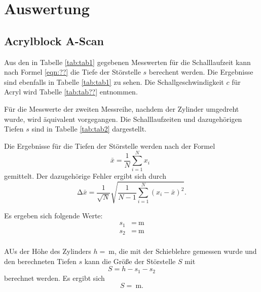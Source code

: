 \section{Auswertung}
\label{sec:Auswertung}

\subsection{Acrylblock A-Scan}

Aus den in Tabelle \ref{tab:tab1} gegebenen Messwerten für die Schalllaufzeit
kann nach Formel \ref{eqn:??} die Tiefe der Störstelle $s$ berechent werden.
Die Ergebnisse sind ebenfalls in Tabelle \ref{tab:tab1} zu sehen.
Die Schallgeschwindigkeit $c$ für Acryl wird Tabelle \ref{tab:tab??}
entnommen.

Für die Messwerte der zweiten Messreihe, nachdem der Zylinder umgedreht wurde,
wird äquivalent vorgegangen. Die Schalllaufzeiten und dazugehörigen Tiefen $s$
sind in Tabelle \ref{tab:tab2} dargestellt.


Die Ergebnisse für die Tiefen der Störstelle werden nach der Formel
\begin{equation}
  \bar{x} = \frac{1}{N} \sum_{i=1}^{N} x_i \: \:
  \label{eqn:mit}
\end{equation}
gemittelt. Der dazugehörige Fehler ergibt sich durch
\begin{equation}
  \increment \bar{x} = \frac{1}{\sqrt{N}} \sqrt{ \frac{1}{N-1} \sum_{i=1}^N
  (x_i - \bar{x})^2}.
  \label{eqn:mitf}
\end{equation}

Es ergeben sich folgende Werte:
\begin{align*}
  s_1&=\SI{}{\m}\\
  s_2&=\SI{}{\m}\\
\end{align*}

AUs der Höhe des Zylinders $h=\SI{}{\m}$, die mit der Schieblehre gemessen wurde und den
berechneten Tiefen $s$ kann die Größe der Störstelle $S$ mit
\begin{equation}
  S=h-s_1 -s_2
\end{equation}
berechnet werden.
Es ergibt sich
\begin{equation}
  S=\SI{}{\m}.
\end{equation}










